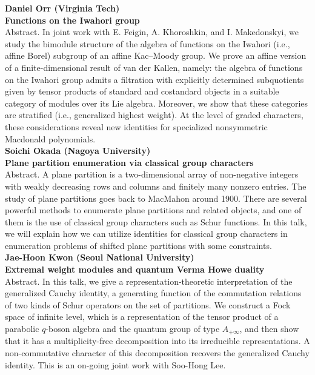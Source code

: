 \documentclass[12pt,landscape]{jarticle}
\begin{document}
\noindent
{\bf\large Daniel Orr (Virginia Tech)} \\
{\bf Functions on the Iwahori group} \\[1mm]
Abstract. 
In joint work with E. Feigin, A. Khoroshkin, and I. Makedonskyi, we study the bimodule structure of the algebra of functions on the Iwahori (i.e., affine Borel) subgroup of an affine Kac--Moody group. We prove an affine version of a finite-dimensional result of van der Kallen, namely: the algebra of functions on the Iwahori group admits a filtration with explicitly determined subquotients given by tensor products of standard and costandard objects in a suitable category of modules over its Lie algebra. Moreover, we show that these categories are stratified (i.e., generalized highest weight). At the level of graded characters, these considerations reveal new identities for specialized nonsymmetric Macdonald polynomials.
\\[5mm]
{\bf\large Soichi Okada (Nagoya University)} \\ 
{\bf Plane partition enumeration via classical group characters} \\[1mm]
Abstract. 
A plane partition is a two-dimensional array of non-negative integers with weakly decreasing rows and columns and finitely many nonzero entries. The study of plane partitions goes back to MacMahon around 1900. There are several powerful methods to enumerate plane partitions and related objects, and one of them is the use of classical group characters such as Schur functions. In this talk, we will explain how we can utilize identities for classical group characters in enumeration problems of shifted plane partitions with some constraints.
\\[5mm]
{\bf\large Jae-Hoon Kwon (Seoul National University)} \\
{\bf Extremal weight modules and quantum Verma Howe duality} \\[1mm]
Abstract. 
In this talk, we give a representation-theoretic interpretation of the generalized Cauchy identity, a generating function of the commutation relations of two kinds of Schur operators on the set of partitions.  We construct a Fock space of infinite level, which is a representation of the tensor product of a parabolic $q$-boson algebra and the quantum group of type $A_{+\infty}$, and then show that it has a multiplicity-free decomposition into its irreducible representations. A non-commutative character of this decomposition recovers the generalized Cauchy identity.
This is an on-going joint work with Soo-Hong Lee.
\\
\hrulefill
\end{document}
